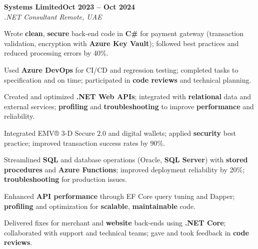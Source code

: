 \documentclass[letterpaper,10pt]{article}
\newcommand{\headingBf}[2]{
  \hspace{10pt}\textbf{#1}\hfill\textbf{#2}\\
}
\newcommand{\headingIt}[2]{
  \hspace{10pt}\textit{#1}\hfill\textit{#2}\\
}
\newenvironment{resume_list}{
  \vspace{-7pt}
  \begin{itemize}[itemsep=-2px, parsep=1pt, leftmargin=30pt]
}{
  \end{itemize}
}
\begin{document}
\headingBf{Systems Limited}{Oct 2023 -- Oct 2024}
\headingIt{.NET Consultant \hfill Remote, UAE}{}
\begin{resume_list}
    \item Wrote \textbf{clean}, \textbf{secure} back-end code in \textbf{C\#} for payment gateway (transaction validation, encryption with \textbf{Azure Key Vault}); followed best practices and reduced processing errors by 40\%.
    \item Used \textbf{Azure DevOps} for CI/CD and regression testing; completed tasks to specification and on time; participated in \textbf{code reviews} and technical planning.
    \item Created and optimized \textbf{.NET Web APIs}; integrated with \textbf{relational} data and external services; \textbf{profiling} and \textbf{troubleshooting} to improve \textbf{performance} and reliability.
    \item Integrated EMV® 3-D Secure 2.0 and digital wallets; applied \textbf{security} best practice; improved transaction success rates by 90\%.
    \item Streamlined \textbf{SQL} and database operations (Oracle, \textbf{SQL Server}) with \textbf{stored procedures} and \textbf{Azure Functions}; improved deployment reliability by 20\%; \textbf{troubleshooting} for production issues.
    \item Enhanced \textbf{API performance} through EF Core query tuning and Dapper; \textbf{profiling} and optimization for \textbf{scalable}, \textbf{maintainable} code.
    \item Delivered fixes for merchant and \textbf{website} back-ends using \textbf{.NET Core}; collaborated with support and technical teams; gave and took feedback in \textbf{code reviews}.
\end{resume_list}
\end{document}
